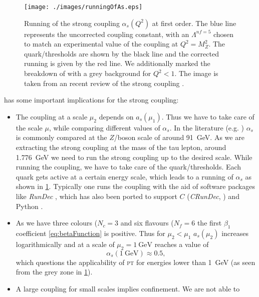 \documentclass[../../index.tex]{subfiles}
\begin{document}
\begin{figure}
  \centering \texttt{[image: ./images/runningOfAs.eps]}
  \caption{Running of the strong coupling \(\alpha_s(Q^2)\) at first order. The
    blue line represents the uncorrected coupling constant, with an
    \(\Lambda^{nf=5}\) chosen to match an experimental value of the coupling at
    \(Q^2=M_Z^2\). The quark\-/thresholds are shown by the black line and the
    corrected running is given by the red line. We additionally marked the
    breakdown of  with a grey background for \(Q^2<1\). The image is
    taken from an recent review of the strong coupling \cite{Deur2016}.}
  \label{fig:runningOfAs}
\end{figure}

 has some important implications for the
strong coupling:
\begin{itemize}
\item The coupling at a scale \(\mu_2\) depends on \(a_s(\mu_1)\). Thus we have
  to take care of the scale \(\mu\), while comparing different values of
  \(\alpha_s\). In the literature (e.g. \cite{PDG2018}) \(\alpha_s\) is commonly
  compared at the \(Z\)\-/boson scale of around \SI{91}{\giga\eV}. As we are
  extracting the strong coupling at the mass of the tau lepton, around
  \SI{1.776}{\giga\eV} we need to run the strong coupling up to the desired
  scale. While running the coupling, we have to take care of the
  quark\-/thresholds. Each quark gets active at a certain energy scale, which
  leads to a running of \(\alpha_s\) as shown in \cref{fig:runningOfAs}.
  Typically one runs the coupling with the aid of software packages like
  \textit{RunDec} \cite{Chetyrkin2000,Herren2017}, which has also been ported to
  support \(C\) (\textit{CRunDec}, \cite{Schmidt2012}) and Python
  \cite{Straub2016}.
\item As we have three colours (\(N_c=3\) and six flavours (\(N_f=6\) the first
  \(\beta_1\) coefficient \ref{eq:betaFunction} is positive. Thus for
  \(\mu_2<\mu_1\) \(a_s(\mu_2)\) increases logarithmically and at a scale of
  \(\mu_2=\SI{1}{\giga\eV}\) reaches a value of
  \begin{equation}
    \alpha_s(\SI{1}{\giga\eV}) \approx 0.5,
  \end{equation}
  which questions the applicability of \textsc{pt} for energies lower than
  \SI{1}{\giga\eV} (as seen from the grey zone in \cref{fig:runningOfAs}).
\item A large coupling for small scales implies confinement. We are not able to

\end{itemize}
\end{document}

